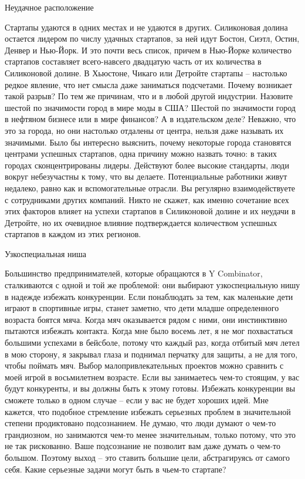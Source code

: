\documentclass[ebook,12pt,oneside,openany]{memoir}
\begin{document}
Неудачное расположение

Стартапы удаются в одних местах и не удаются в других. Силиконовая
долина остается лидером по числу удачных стартапов, за ней идут
Бостон, Сиэтл, Остин, Денвер и Нью-Йорк. И это почти весь список,
причем в Нью-Йорке количество стартапов составляет всего-навсего
двадцатую часть от их количества в Силиконовой долине. В Хьюстоне,
Чикаго или Детройте стартапы – настолько редкое явление, что нет
смысла даже заниматься подсчетами. Почему возникает такой разрыв? По
тем же причинам, что и в любой другой индустрии. Назовите шестой по
значимости город в мире моды в США? Шестой по значимости город в
нефтяном бизнесе или в мире финансов? А в издательском деле? Неважно,
что это за города, но они настолько отдалены от центра, нельзя даже
называть их значимыми. Было бы интересно выяснить, почему некоторые
города становятся центрами успешных стартапов, одна причину можно
назвать точно: в таких городах сконцентрированы лидеры. Действуют
более высокие стандарты, люди вокруг небезучастны к тому, что вы
делаете. Потенциальные работники живут недалеко, равно как и
вспомогательные отрасли. Вы регулярно взаимодействуете с сотрудниками
других компаний. Никто не скажет, как именно сочетание всех этих
факторов влияет на успехи стартапов в Силиконовой долине и их неудачи
в Детройте, но их очевидное влияние подтверждается количеством
успешных стартапов в каждом из этих регионов.

Узкоспециальная ниша

Большинство предпринимателей, которые обращаются в Y Combinator,
сталкиваются с одной и той же проблемой: они выбирают узкоспециальную
нишу в надежде избежать конкуренции. Если понаблюдать за тем, как
маленькие дети играют в спортивные игры, станет заметно, что дети
младше определенного возраста боятся мяча. Когда мяч оказывается рядом
с ними, они инстинктивно пытаются избежать контакта. Когда мне было
восемь лет, я не мог похвастаться большими успехами в бейсболе, потому
что каждый раз, когда отбитый мяч летел в мою сторону, я закрывал
глаза и поднимал перчатку для защиты, а не для того, чтобы поймать
мяч. Выбор малопривлекательных проектов можно сравнить с моей игрой в
восьмилетнем возрасте. Если вы занимаетесь чем-то стоящим, у вас будут
конкуренты, и вы должны быть к этому готовы. Избежать конкуренции вы
сможете только в одном случае – если у вас не будет хороших идей. Мне
кажется, что подобное стремление избежать серьезных проблем в
значительной степени продиктовано подсознанием. Не думаю, что люди
думают о чем-то грандиозном, но занимаются чем-то менее значительным,
только потому, что это не так рискованно. Ваше подсознание не позволит
вам даже думать о чем-то большом. Поэтому выход – это ставить большие
цели, абстрагируясь от самого себя. Какие серьезные задачи могут быть
в чьем-то стартапе?
\end{document}
